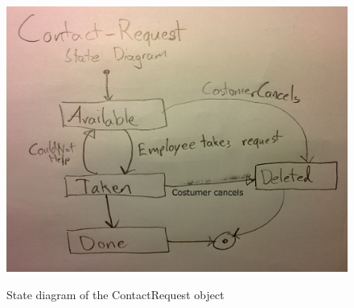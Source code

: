 \begin{figure}[H]
	\centering
		\includegraphics[width=\textwidth]{Figures/StateDiagram-ContactRequest}\\
	\caption{State diagram of the ContactRequest object}
  \label{fig:StateDiagram-ContactRequest}
\end{figure}